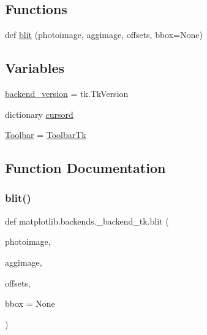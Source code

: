 \subsection*{Functions}
\begin{DoxyCompactItemize}
\item 
def \hyperlink{namespacematplotlib_1_1backends_1_1__backend__tk_a338470990726abf69035544dec8a7e94}{blit} (photoimage, aggimage, offsets, bbox=None)
\end{DoxyCompactItemize}
\subsection*{Variables}
\begin{DoxyCompactItemize}
\item 
\hyperlink{namespacematplotlib_1_1backends_1_1__backend__tk_ad8b7798437f407c3536f23a2005684ff}{backend\+\_\+version} = tk.\+Tk\+Version
\item 
dictionary \hyperlink{namespacematplotlib_1_1backends_1_1__backend__tk_af56246acc7da1bc6b214ded219324136}{cursord}
\item 
\hyperlink{namespacematplotlib_1_1backends_1_1__backend__tk_acfe241fed63edba68189f3c46b3fdff2}{Toolbar} = \hyperlink{classmatplotlib_1_1backends_1_1__backend__tk_1_1ToolbarTk}{Toolbar\+Tk}
\end{DoxyCompactItemize}


\subsection{Function Documentation}
\mbox{\label{namespacematplotlib_1_1backends_1_1__backend__tk_a338470990726abf69035544dec8a7e94}} 
\subsubsection{\texorpdfstring{blit()}{blit()}}
{\footnotesize\ttfamily def matplotlib.\+backends.\+\_\+backend\+\_\+tk.\+blit (\begin{DoxyParamCaption}\item[{}]{photoimage,  }\item[{}]{aggimage,  }\item[{}]{offsets,  }\item[{}]{bbox = {\ttfamily None} }\end{DoxyParamCaption})}

